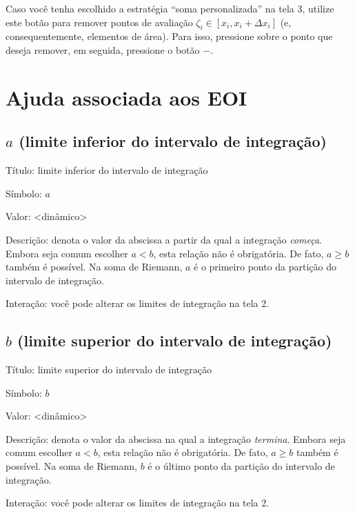 \documentclass[a4paper,10pt]{scrartcl}
\newcommand\subintervalo{\ensuremath{[x_i, x_i + \Delta x_i]}}
\begin{document}
    Caso você tenha escolhido a estratégia ``soma personalizada'' na tela 3, utilize este botão para remover pontos de avaliação $\zeta_i \in \subintervalo$ (e, consequentemente, elementos de área). Para isso, pressione sobre o ponto que deseja remover, em seguida, pressione o botão $-$.
    
  \section*{Ajuda associada aos EOI}

  \subsection*{$a$ (limite inferior do intervalo de integração)}
    \begin{compactdesc}
      \item{Título:} limite inferior do intervalo de integração
      \item{Símbolo:} $a$
      \item{Valor:} <dinâmico>
      \item{Descrição:} denota o valor da abscissa a partir da qual a integração \emph{começa}. Embora seja comum escolher $a < b$, esta relação não é obrigatória. De fato, $a \ge b$ também é possível. Na soma de Riemann, $a$ é o primeiro ponto da partição do intervalo de integração.
      \item{Interação:} você pode alterar os limites de integração na tela 2.
    \end{compactdesc}

  \subsection*{$b$ (limite superior do intervalo de integração)}
    \begin{compactdesc}
      \item{Título:} limite superior do intervalo de integração
      \item{Símbolo:} $b$
      \item{Valor:} <dinâmico>
      \item{Descrição:} denota o valor da abscissa na qual a integração \emph{termina}. Embora seja comum escolher $a < b$, esta relação não é obrigatória. De fato, $a \ge b$ também é possível. Na soma de Riemann, $b$ é o último ponto da partição do intervalo de integração.
      \item{Interação:} você pode alterar os limites de integração na tela 2.
    \end{compactdesc}
\end{document}
